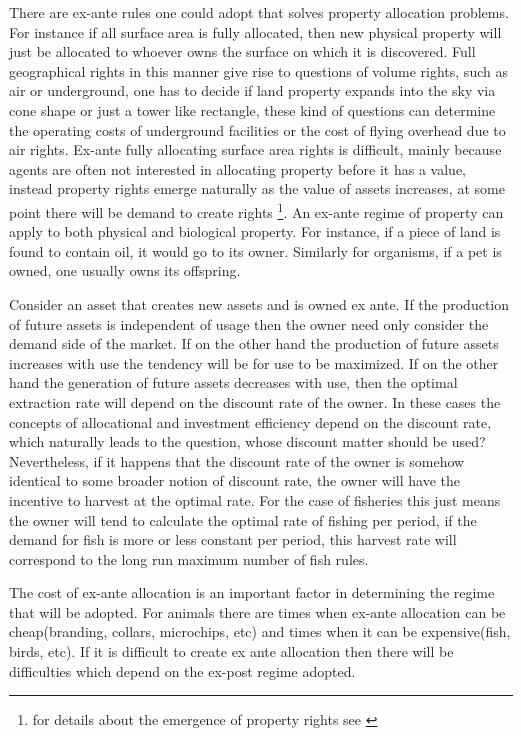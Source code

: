 \documentclass[12pt]{article}
\numberwithin{equation}{section}
\begin{document}
There are ex-ante rules one could adopt that solves property allocation problems. For instance if all surface area is fully allocated, then new physical property will just be allocated to whoever owns the surface on which it is discovered. Full geographical rights in this manner give rise to questions of volume rights, such as air or underground, one has to decide if land property expands into the sky via cone shape or just a tower like rectangle, these kind of questions can determine the operating costs of underground facilities or the cost of flying overhead due to air rights. Ex-ante fully allocating surface area rights is difficult, mainly because agents are often not interested in allocating property before it has a value, instead property rights emerge naturally as the value of assets increases, at some point there will be demand to create rights \footnote{for details about the emergence of property rights see \cite{Alchian1973}}. An ex-ante regime of property can apply to both physical and biological property. For instance, if a piece of land is found to contain oil, it would go to its owner. Similarly for organisms, if a pet is owned, one usually owns its offspring.

Consider an asset that creates new assets and is owned ex ante. If the production of future assets is independent of usage then the owner need only consider the demand side of the market. If on the other hand the production of future assets increases with use the tendency will be for use to be maximized. If on the other hand the generation of future assets decreases with use, then the optimal extraction rate will depend on the discount rate of the owner. In these cases the concepts of allocational and investment efficiency depend on the discount rate, which naturally leads to the question, whose discount matter should be used? Nevertheless, if it happens that the discount rate of the owner is somehow identical to some broader notion of discount rate, the owner will have the incentive to harvest at the optimal rate. For the case of fisheries this just means the owner will tend to calculate the optimal rate of fishing per period, if the demand for fish is more or less constant per period, this harvest rate will correspond to the long run maximum number of fish rules.

The cost of ex-ante allocation is an important factor in determining the regime that will be adopted. For animals there are times when ex-ante allocation can be cheap(branding, collars, microchips, etc) and times when it can be expensive(fish, birds, etc). If it is difficult to create ex ante allocation then there will be difficulties which depend on the ex-post regime adopted.
\end{document}
